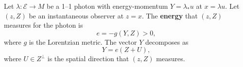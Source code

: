 Let $\lambda: \mathcal{E} \rightarrow M$ be a 1--1 photon with energy-momentum $Y = \lambda_* u$ at $x = \lambda u$. Let $(z, Z)$ be an instantaneous observer at $z = x$. The \textbf{energy} that $(z, Z)$ measures for the photon is
$$
e = -g(Y, Z) > 0,
$$
where $g$ is the Lorentzian metric. The vector $Y$ decomposes as
$$
Y = e(Z + U),
$$
where $U \in Z^\perp$ is the spatial direction that $(z, Z)$ measures.
